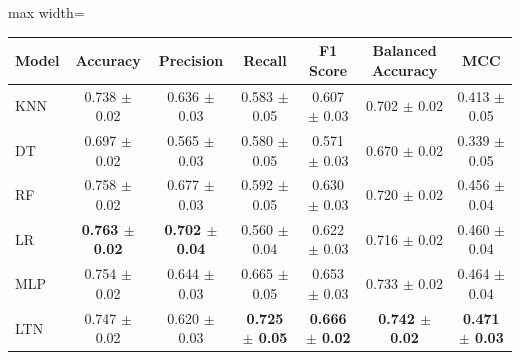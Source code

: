 \begin{table}[]
    \centering
    \begin{adjustbox}{max width=\textwidth}
        \begin{tabular}{|l|c|c|c|c|c|c|}
            \hline
            \textbf{Model} & \textbf{Accuracy} & \textbf{Precision} & \textbf{Recall} & \textbf{F1 Score} & \textbf{Balanced Accuracy} & \textbf{MCC} \\
            \hline
            KNN  & 0.738 $\pm$  0.02 & 0.636 $\pm$  0.03 & 0.583 $\pm$  0.05 & 0.607 $\pm$  0.03 & 0.702 $\pm$  0.02 & 0.413 $\pm$  0.05 \\
            \hline
            DT   & 0.697 $\pm$  0.02 & 0.565 $\pm$  0.03 & 0.580 $\pm$  0.05 & 0.571 $\pm$  0.03 & 0.670 $\pm$  0.02 & 0.339 $\pm$  0.05 \\
            \hline
            RF   & 0.758 $\pm$  0.02 & 0.677 $\pm$  0.03 & 0.592 $\pm$  0.05 & 0.630 $\pm$  0.03 & 0.720 $\pm$  0.02 & 0.456 $\pm$  0.04 \\
            \hline
            LR   & \textbf{0.763 $\pm$  0.02 }& \textbf{0.702 $\pm$  0.04} & 0.560 $\pm$  0.04 & 0.622 $\pm$  0.03 & 0.716 $\pm$  0.02 & 0.460 $\pm$  0.04 \\
            \hline
            MLP  & 0.754 $\pm$  0.02 & 0.644 $\pm$  0.03 & 0.665 $\pm$  0.05 & 0.653 $\pm$  0.03 & 0.733 $\pm$  0.02 & 0.464 $\pm$  0.04 \\
            \hline
            LTN  & 0.747 $\pm$  0.02 & 0.620 $\pm$  0.03 & \textbf{0.725 $\pm$  0.05} & \textbf{0.666 $\pm$  0.02} & \textbf{0.742 $\pm$  0.02} & \textbf{0.471 $\pm$  0.03} \\
            \hline
        \end{tabular}
    \end{adjustbox}
    \label{tab:ski-diabetes-performance-metrics}
\end{table}